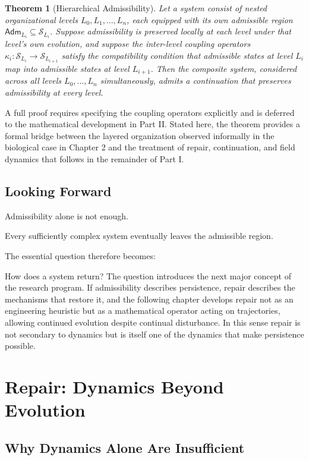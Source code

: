 \documentclass[11pt,oneside]{book}
\numberwithin{equation}{chapter}
\theoremstyle{definition}
\theoremstyle{plain}
\newtheorem{theorem}[definition]{Theorem}
\newcommand{\State}{\mathcal{S}}
\newcommand{\Adm}{\mathsf{Adm}}
\begin{document}
\begin{theorem}[Hierarchical Admissibility]
Let a system consist of nested organizational levels
\(L_0, L_1, \ldots, L_n\), each equipped with its own admissible region
\(\Adm_{L_i} \subseteq \State_{L_i}\). Suppose admissibility is preserved
locally at each level under that level's own evolution, and suppose the
inter-level coupling operators
\(
\kappa_i : \State_{L_i} \rightarrow \State_{L_{i+1}}
\)
satisfy the compatibility condition that admissible states at level
\(L_i\) map into admissible states at level \(L_{i+1}\). Then the
composite system, considered across all levels
\(L_0, \ldots, L_n\) simultaneously, admits a continuation that preserves
admissibility at every level.
\end{theorem}

A full proof requires specifying the coupling operators explicitly and is
deferred to the mathematical development in Part II. Stated here, the
theorem provides a formal bridge between the layered organization observed
informally in the biological case in Chapter 2 and the treatment of repair,
continuation, and field dynamics that follows in the remainder of Part I.

\section{Looking Forward}

Admissibility alone is not enough.

Every sufficiently complex system eventually leaves the admissible region.

The essential question therefore becomes:

How does a system return? The question introduces the next major concept of the research program. If admissibility describes persistence, repair describes the mechanisms that restore it, and the following chapter develops repair not as an engineering heuristic but as a mathematical operator acting on trajectories, allowing continued evolution despite continual disturbance. In this sense repair is not secondary to dynamics but is itself one of the dynamics that make persistence possible.

\chapter{Repair: Dynamics Beyond Evolution}

\section{Why Dynamics Alone Are Insufficient}
\end{document}
